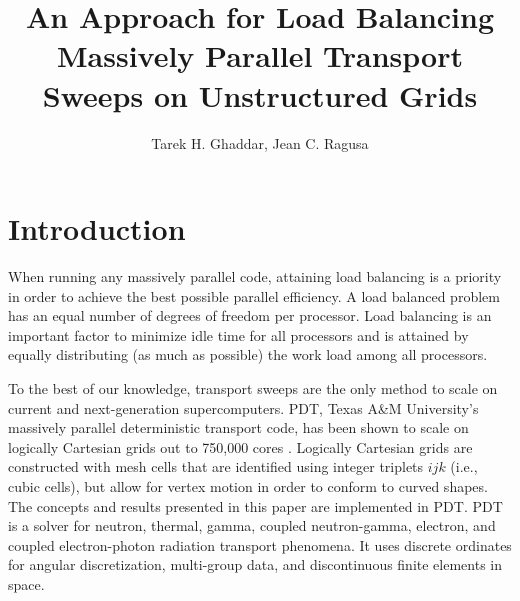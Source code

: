 \documentclass{anstrans}
\title{An Approach for Load Balancing Massively Parallel Transport Sweeps on Unstructured Grids}
\author{Tarek H. Ghaddar, Jean C. Ragusa}
\institute{
Dept. of Nuclear Engineering, Texas A\&M University, College Station, TX, 77843-3133
}
\begin{document}
\vspace*{-42pt}
\begin{strip}
\vspace*{14pt}
\end{strip}


\section{Introduction}
When running any massively parallel code, attaining load balancing is a priority in order to achieve the best possible parallel efficiency. A load balanced problem has an equal number of degrees of freedom per processor. Load balancing is an important factor to minimize idle time for all processors and is attained by equally distributing (as much as possible) the work load among all processors. 

To the best of our knowledge, transport sweeps are the only method to scale on current and next-generation supercomputers. PDT, Texas A\&M University's massively parallel deterministic transport code, has been shown to scale on logically Cartesian grids out to 750,000 cores \cite{mpadams2015}. Logically Cartesian grids are constructed with mesh cells that are identified using integer triplets $ijk$ (i.e., cubic cells), but allow for vertex motion in order to conform to curved shapes. The concepts and results presented in this paper are implemented in PDT. PDT is a solver for neutron, thermal, gamma, coupled neutron-gamma, electron, and coupled electron-photon radiation transport phenomena. It uses discrete ordinates for angular discretization, multi-group data, and discontinuous finite elements in space. 
\end{document}

